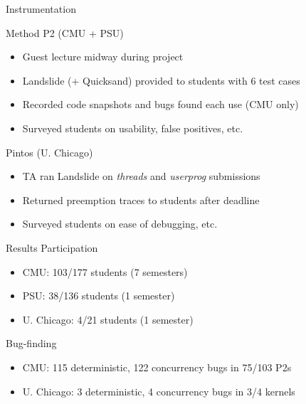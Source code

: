 \documentclass[xcolor=dvipsnames]{beamer}
\begin{document}
\begin{frame}{Instrumentation}

\end{frame}


\begin{frame}{Method}
	P2 (CMU + PSU)
	\begin{itemize}
		\item Guest lecture midway during project
		\item Landslide (+ Quicksand) provided to students with 6 test cases %
		\item Recorded code snapshots and bugs found each use (CMU only)
		\item Surveyed students on usability, false positives, etc.
	\end{itemize}
	\pause
	\linegap

	Pintos (U. Chicago)
	\begin{itemize}
		\item TA %
			ran Landslide on {\em threads} and {\em userprog} submissions
		\item Returned preemption traces to students after deadline
		\item Surveyed students on ease of debugging, etc.
	\end{itemize}
\end{frame}

\begin{frame}{Results}
	Participation
	\begin{itemize}
		\item CMU: 103/177 students (7 semesters)
		\item PSU: 38/136 students (1 semester)
		\item U. Chicago: 4/21 students (1 semester)
	\end{itemize}
	\linegap

	Bug-finding
	\begin{itemize}
		\item CMU: 115 deterministic, 122 concurrency bugs in 75/103 P2s
		\item U. Chicago: 3 deterministic, 4 concurrency bugs in 3/4 kernels
	\end{itemize}
\end{frame}
\end{document}
